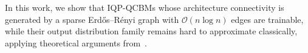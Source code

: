\documentclass{article}
\theoremstyle{plain}
\theoremstyle{definition}
\theoremstyle{remark}
\begin{document}
In this work, we show that IQP-QCBMs whose architecture connectivity is generated by a sparse Erd\H{o}s--R\'enyi graph with $\mathcal{O}(n\log n)$ edges are trainable, while their output distribution family remains hard to approximate classically, applying theoretical arguments from~\citet{Bremner17}.
\end{document}
